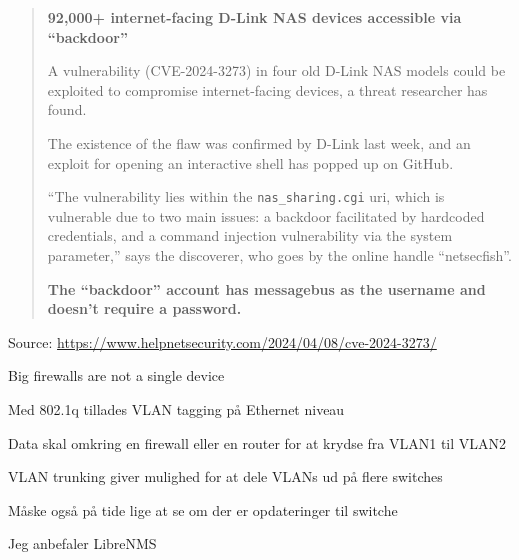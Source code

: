 \documentclass[Screen16to9,17pt]{foils}
\begin{document}


\begin{quote}{\large\bf
92,000+ internet-facing D-Link NAS devices accessible via “backdoor”}

A vulnerability (CVE-2024-3273) in four old D-Link NAS models could be exploited to compromise internet-facing devices, a threat researcher has found.

The existence of the flaw was confirmed by D-Link last week, and an exploit for opening an interactive shell has popped up on GitHub.

“The vulnerability lies within the \verb+nas_sharing.cgi+ uri, which is vulnerable due to two main issues: a backdoor facilitated by hardcoded credentials, and a command injection vulnerability via the system parameter,” says the discoverer, who goes by the online handle “netsecfish”.

{\bf The “backdoor” account has messagebus as the username and doesn’t require a password.}
\end{quote}
Source: \url{https://www.helpnetsecurity.com/2024/04/08/cve-2024-3273/}





\centerline{Big firewalls are not a single device}





\begin{list1}
\item Med 802.1q tillades VLAN tagging på Ethernet niveau
\item Data skal omkring en firewall eller en router for at krydse fra VLAN1 til VLAN2
\item VLAN trunking giver mulighed for at dele VLANs ud på flere switches
\end{list1}




\begin{list2}
\item Måske også på tide lige at se om der er opdateringer til switche
\item Jeg anbefaler LibreNMS 
\end{list2}
\end{document}
